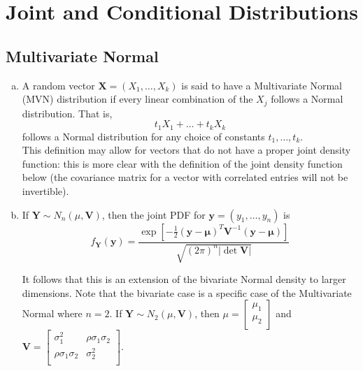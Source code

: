 \newpage

\section{Joint and Conditional Distributions}

\subsection{Multivariate Normal}

\begin{enumerate}[a)]
    \item A random vector $\mathbf{X} = (X_1, \dots, X_k)$ is said to have a Multivariate Normal (MVN) distribution if every
    linear combination of the $X_j$ follows a Normal distribution. That is,
    \[
        t_1 X_1 + \dots + t_k X_k 
    \]
    follows a Normal distribution for any choice of constants $t_1, \dots, t_k$. \\

    This definition may allow for vectors that do not have a proper joint density function: this is more clear with the definition of the joint density function below (the covariance matrix for a vector with correlated entries will not be invertible).

    \item If $\mathbf{Y} \sim N_n(\mu, \mathbf{V})$, then the joint PDF for $\mathbf{y} = (y_1, \dots, y_n)$ is
    \[
        f_{\mathbf{Y}}(\mathbf{y}) = \frac{\exp \left[ -\frac{1}{2}(\mathbf{y} -\mathbf{\mu})^T \mathbf{V}^{-1} (\mathbf{y} - \mathbf{\mu}) \right]}{\sqrt{(2\pi )^n |\det \mathbf{V}|}}
    \]

    It follows that this is an extension of the bivariate Normal density to larger dimensions. Note that the bivariate case is a specific case of the Multivariate Normal where $n = 2$.
    If $\mathbf{Y} \sim N_2(\mu, \mathbf{V})$, then $\mu = \begin{bmatrix}
        \mu_1 \\
        \mu_2 \\
    \end{bmatrix}$ and $\mathbf{V} = \begin{bmatrix}
        \sigma_1^2 & \rho \sigma_1\sigma_2   \\
        \rho \sigma_1\sigma_2 & \sigma_2^2  \\
    \end{bmatrix}$. \\


\end{enumerate}
